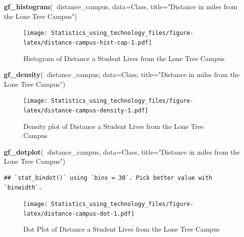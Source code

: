 \documentclass[
]{book}
\newenvironment{Shaded}{\begin{snugshade}}{\end{snugshade}}
\newcommand{\DataTypeTok}[1]{\textcolor[rgb]{0.13,0.29,0.53}{#1}}
\newcommand{\KeywordTok}[1]{\textcolor[rgb]{0.13,0.29,0.53}{\textbf{#1}}}
\newcommand{\NormalTok}[1]{#1}
\newcommand{\OperatorTok}[1]{\textcolor[rgb]{0.81,0.36,0.00}{\textbf{#1}}}
\newcommand{\StringTok}[1]{\textcolor[rgb]{0.31,0.60,0.02}{#1}}
\begin{document}
\begin{Shaded}
\begin{Highlighting}[]
\KeywordTok{gf_histogram}\NormalTok{(}\OperatorTok{~}\NormalTok{distance_campus, }\DataTypeTok{data=}\NormalTok{Class, }\DataTypeTok{title=}\StringTok{"Distance in miles }
\StringTok{             from the Lone Tree Campus"}\NormalTok{)}
\end{Highlighting}
\end{Shaded}

\begin{figure}
\centering
\texttt{[image: Statistics\_using\_technology\_files/figure-latex/distance-campus-hist-cap-1.pdf]}
\caption{\label{fig:distance-campus-hist-cap}Histogram of Distance a Student Lives from the Lone Tree Campus}
\end{figure}



\begin{Shaded}
\begin{Highlighting}[]
\KeywordTok{gf_density}\NormalTok{(}\OperatorTok{~}\NormalTok{distance_campus, }\DataTypeTok{data=}\NormalTok{Class, }\DataTypeTok{title=}\StringTok{"Distance in miles }
\StringTok{           from the Lone Tree Campus"}\NormalTok{)}
\end{Highlighting}
\end{Shaded}

\begin{figure}
\centering
\texttt{[image: Statistics\_using\_technology\_files/figure-latex/distance-campus-density-1.pdf]}
\caption{\label{fig:distance-campus-density}Density plot of Distance a Student Lives from the Lone Tree Campus}
\end{figure}



\begin{Shaded}
\begin{Highlighting}[]
\KeywordTok{gf_dotplot}\NormalTok{(}\OperatorTok{~}\NormalTok{distance_campus, }\DataTypeTok{data=}\NormalTok{Class, }\DataTypeTok{title=}\StringTok{"Distance in miles }
\StringTok{           from the Lone Tree Campus"}\NormalTok{)}
\end{Highlighting}
\end{Shaded}

\begin{verbatim}
## `stat_bindot()` using `bins = 30`. Pick better value with `binwidth`.
\end{verbatim}

\begin{figure}
\centering
\texttt{[image: Statistics\_using\_technology\_files/figure-latex/distance-campus-dot-1.pdf]}
\caption{\label{fig:distance-campus-dot}Dot Plot of Distance a Student Lives from the Lone Tree Campus}
\end{figure}
\end{document}
